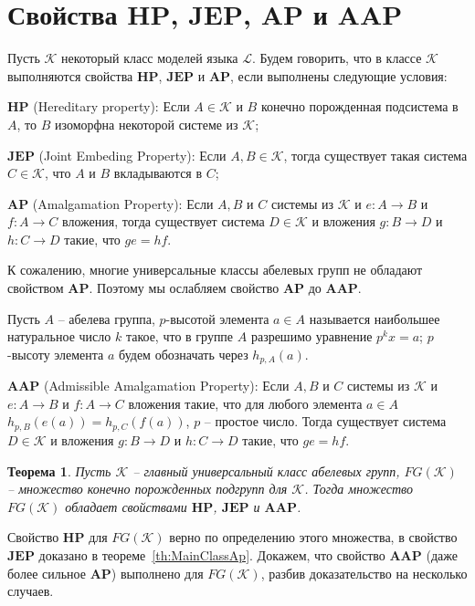 \documentclass[12pt]{extarticle} %
\newtheorem{theorem}{Теорема}[section]
\def\proof{{\noindent{\bf Доказательство.}} }
\def\K{{\mathcal{K}}}
\def\L{{\mathcal{L}}}
\def\HP{\textbf{HP}}
\def\JEP{\textbf{JEP}}
\def\AP{\textbf{AP}}
\def\AAP{\textbf{AAP}}
\begin{document}
\section{Свойства $\HP$, $\JEP$, $\AP$ и $\AAP$}
Пусть $\K$ некоторый класс моделей языка $\L$. Будем говорить, что в классе $\K$ выполняются свойства $\HP$, $\JEP$ и $\AP$, если выполнены следующие условия:

\noindent $\HP$ (Hereditary property): Если $A \in \K$ и $B$ конечно порожденная подсистема в $A$, то $B$ изоморфна некоторой системе из $\K$; 

\noindent$\JEP$ (Joint Embeding Property): Если $A, B \in \K$, тогда существует такая система $C \in \K$, что $A$ и $B$ вкладываются в $C$;

\noindent$\AP$ (Amalgamation Property): Если $A, B$ и $C$ системы из $\K$ и $e: A \rightarrow B$ и $f: A \rightarrow C$ вложения, тогда существует система $D \in \K$ и вложения $g : B \rightarrow D$ и $h : C \rightarrow D$ такие, что $ge = hf$.

К сожалению, многие универсальные классы абелевых групп не обладают свойством $\AP$. Поэтому мы ослабляем свойство $\AP$ до $\AAP$.

Пусть $A$ -- абелева группа, $p$-высотой элемента $a \in A$ называется наибольшее натуральное число $k$ такое, что в группе $A$ разрешимо уравнение $p^k x = a$; $p$-высоту элемента $a$ будем обозначать через $h_{p,A}(a)$. 

\noindent$\AAP$ (Admissible Amalgamation Property): Если $A, B$ и $C$ системы из $\K$ и $e: A \rightarrow B$ и $f: A \rightarrow C$ вложения такие, что для любого элемента $a \in A$ $h_{p,B}(e(a)) = h_{p,C}(f(a))$, $p$ -- простое число. Тогда существует система $D \in \K$ и вложения $g : B \rightarrow D$ и $h : C \rightarrow D$ такие, что $ge = hf$.


\begin{theorem}
Пусть $\K$ -- главный универсальный класс абелевых групп, $FG(\K)$ -- множество конечно порожденных подгрупп для $\K$. Тогда множество $FG(\K)$ обладает свойствами $\HP$, $\JEP$ и $\AAP$.
\end{theorem}

\proof Свойство $\HP$ для $FG(\K)$ верно по определению этого множества, в свойство $\JEP$ доказано в теореме~\ref{th:MainClassAp}. 
Докажем, что свойство $\AAP$ (даже более сильное $\AP$) выполнено для $FG(\K)$, разбив доказательство на несколько случаев.
\end{document}
